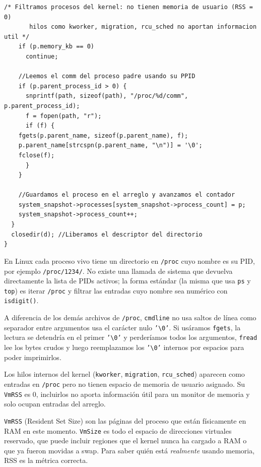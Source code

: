 \documentclass[12pt,letterpaper]{article}
\begin{document}
\begin{lstlisting}[style=modernc, caption={\texttt{monitor.c} collect\_processes() (líneas 49--122)}]
    /* Filtramos procesos del kernel: no tienen memoria de usuario (RSS = 0)
       hilos como kworker, migration, rcu_sched no aportan informacion util */
    if (p.memory_kb == 0)
      continue;

    //Leemos el comm del proceso padre usando su PPID
    if (p.parent_process_id > 0) {
      snprintf(path, sizeof(path), "/proc/%d/comm", p.parent_process_id);
      f = fopen(path, "r");
      if (f) {
	fgets(p.parent_name, sizeof(p.parent_name), f);
	p.parent_name[strcspn(p.parent_name, "\n")] = '\0';
	fclose(f);
      }
    }

    //Guardamos el proceso en el arreglo y avanzamos el contador
    system_snapshot->processes[system_snapshot->process_count] = p;
    system_snapshot->process_count++;
  }
  closedir(d); //Liberamos el descriptor del directorio
}
\end{lstlisting}

\bigskip

En Linux cada proceso vivo tiene un directorio en \texttt{/proc} cuyo nombre es su PID, por ejemplo \texttt{/proc/1234/}. No existe una llamada de sistema que devuelva directamente la lista de PIDs activos; la forma estándar
(la misma que usa \texttt{ps} y \texttt{top}) es iterar \texttt{/proc} y filtrar las entradas cuyo nombre sea
numérico con \texttt{isdigit()}.

\medskip

A diferencia de los demás archivos de \texttt{/proc}, \texttt{cmdline} no usa saltos de línea como separador
entre argumentos usa el carácter nulo \texttt{'\textbackslash0'}. Si usáramos \texttt{fgets}, la lectura se
detendría en el primer \texttt{'\textbackslash0'} y perderíamos todos los argumentos, \texttt{fread} lee los
bytes crudos y luego reemplazamos los \texttt{'\textbackslash0'} internos por espacios para poder imprimirlos.

\medskip

Los hilos internos del kernel (\texttt{kworker}, \texttt{migration}, \texttt{rcu\_sched}) aparecen como entradas
en \texttt{/proc} pero no tienen espacio de memoria de usuario asignado. Su \texttt{VmRSS} es 0, incluirlos no
aporta información útil para un monitor de memoria y solo ocupan entradas del arreglo.

\medskip

\texttt{VmRSS} (Resident Set Size) son las páginas del proceso que están físicamente en RAM en este momento.
\texttt{VmSize} es todo el espacio de direcciones virtuales reservado, que puede incluir regiones que el kernel
nunca ha cargado a RAM o que ya fueron movidas a swap. Para saber quién está \textit{realmente} usando memoria,
RSS es la métrica correcta.
\end{document}
